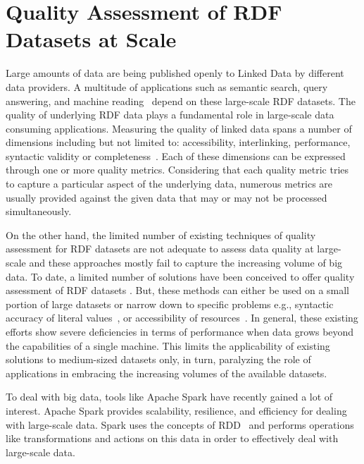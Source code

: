 \chapter{Quality Assessment of RDF Datasets at Scale}
\label{chapter:dist_quality_assessment}
Large amounts of data are being published openly to Linked Data by different data providers. 
A multitude of applications such as semantic search, query answering, and machine reading~\cite{rw2014} depend on these large-scale RDF datasets.  
The quality of underlying RDF data plays a fundamental role in large-scale data consuming applications. 
Measuring the quality of linked data spans a number of dimensions including but not limited to: accessibility, interlinking, performance, syntactic validity or completeness~\cite{zaveri2015quality}.
Each of these dimensions can be expressed through one or more quality metrics. 
Considering that each quality metric tries to capture a particular aspect of the underlying data, numerous metrics are usually provided against the given data that may or may not be processed simultaneously.

On the other hand, the limited number of existing techniques of quality assessment for RDF datasets are not adequate to assess data quality at large-scale and these approaches mostly fail to capture the increasing volume of big data. 
To date, a limited number of solutions have been conceived to offer quality assessment of RDF datasets \cite{Debattista0AC18,farber2018,beek2018,debattista2016luzzu}.
But, these methods can either be used on a small portion of large datasets \cite{farber2018} or narrow down to specific problems e.g., syntactic accuracy of literal values~\cite{beek2018}, or accessibility of resources~\cite{Mihindukulasooriya2016LDSA}.
In general, these existing efforts show severe deficiencies in terms of performance when data grows beyond the capabilities of a single machine.
This limits the applicability of existing solutions to medium-sized datasets only, in turn, paralyzing the role of applications in embracing the increasing volumes of the available datasets.

To deal with big data, tools like Apache Spark have recently gained a lot of interest. 
Apache Spark provides scalability, resilience, and efficiency for dealing with large-scale data. Spark uses the concepts of \gls{RDD}~\cite{zaharia2012resilient} and performs operations like transformations and actions on this data in order to effectively deal with large-scale data. 

